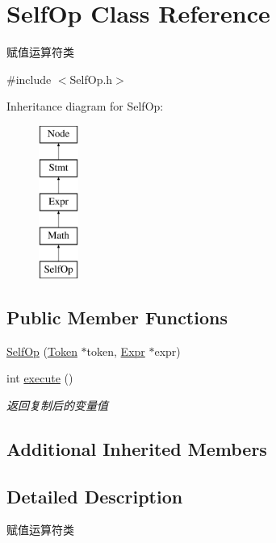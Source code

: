 \hypertarget{class_self_op}{}\section{Self\+Op Class Reference}
\label{class_self_op}


赋值运算符类  




{\ttfamily \#include $<$Self\+Op.\+h$>$}

Inheritance diagram for Self\+Op\+:\begin{figure}[H]
\begin{center}
\leavevmode
\includegraphics[height=5.000000cm]{class_self_op}
\end{center}
\end{figure}
\subsection*{Public Member Functions}
\begin{DoxyCompactItemize}
\item 
\hyperlink{class_self_op_a5292e81fca1817185db15b29564a32ee}{Self\+Op} (\hyperlink{class_token}{Token} $\ast$token, \hyperlink{class_expr}{Expr} $\ast$expr)
\item 
int \hyperlink{class_self_op_ab452bcad1cd4f1286813b1f737583818}{execute} ()
\begin{DoxyCompactList}\small\item\em 返回复制后的变量值 \end{DoxyCompactList}\end{DoxyCompactItemize}
\subsection*{Additional Inherited Members}


\subsection{Detailed Description}
赋值运算符类 

